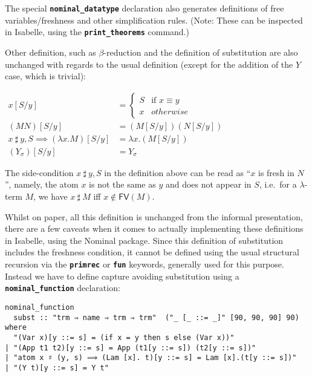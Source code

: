 \documentclass[a4paper, 12pt, twoside]{style/ociamthesis}
\theoremstyle{plain}
\theoremstyle{definition}
\newtheorem{Definition}{Definition}[chapter]
\theoremstyle{remark}
\newcommand{\fv}{\textsf{FV}}
\renewenvironment{Definition}{\begin{OldDefinition}\begin{mdframed}[style=example, linecolor=cyan]}{\end{mdframed}\end{OldDefinition}}
\begin{document}
The special \textbf{\texttt{nominal\_datatype}} declaration also
generates definitions of free variables/freshness and other
simplification rules. (Note: These can be inspected in Isabelle, using
the \textbf{\texttt{print\_theorems}} command.)

Other definition, such as \(\beta\)-reduction and the definition of
substitution are also unchanged with regards to the usual definition
(except for the addition of the \(Y\) case, which is trivial):

\begin{Definition}[Capture-avoiding substitution]

\begin{center}
$\begin{aligned}
x[S/y] &= \begin{cases}
S & \text{if }x \equiv y\\
x & otherwise
\end{cases}\\
(MN)[S/y] &= (M[S/y])(N[S/y])\\
x\ \sharp\ y , S \implies (\lambda x.M)[S/y] &= \lambda x.(M[S/y])\\
(Y_\sigma)[S/y] &= Y_\sigma
\end{aligned}$
\end{center}

\end{Definition}

The side-condition \(x\ \sharp\ y , S\) in the definition above can be
read as ``\(x\) is fresh in \(N\)'', namely, the atom \(x\) is not the
same as \(y\) and does not appear in \(S\), i.e.~for a \(\lambda\)-term
\(M\), we have \(x\ \sharp\ M\) iff \(x \not\in \fv(M)\).

Whilst on paper, all this definition is unchanged from the informal
presentation, there are a few caveats when it comes to actually
implementing these definitions in Isabelle, using the Nominal package.
Since this definition of substitution includes the freshness condition,
it cannot be defined using the usual structural recursion via the
\textbf{\texttt{primrec}} or \textbf{\texttt{fun}} keywords, generally
used for this purpose. Instead we have to define capture avoiding
substitution using a \textbf{\texttt{nominal\_function}} declaration:

\begin{verbatim}
nominal_function
  subst :: "trm ⇒ name ⇒ trm ⇒ trm"  ("_ [_ ::= _]" [90, 90, 90] 90)
where
  "(Var x)[y ::= s] = (if x = y then s else (Var x))"
| "(App t1 t2)[y ::= s] = App (t1[y ::= s]) (t2[y ::= s])"
| "atom x ♯ (y, s) ⟹ (Lam [x]. t)[y ::= s] = Lam [x].(t[y ::= s])"
| "(Y t)[y ::= s] = Y t"
\end{verbatim}
\end{document}
